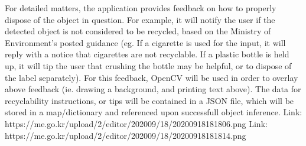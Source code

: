 \documentclass[conference]{IEEEtran}
\begin{document}
For detailed matters, the application provides feedback on how to properly dispose of the object in question. For example, it will notify the user if the detected object is not considered to be recycled, based on the Ministry of Environment's posted guidance (eg. If a cigarette is used for the input, it will reply with a notice that cigarettes are not recyclable. If a plastic bottle is held up, it will tip the user that crushing the bottle may be helpful, or to dispose of the label separately).
\newline
For this feedback, OpenCV will be used in order to overlay above feedback (ie. drawing a background, and printing text above). The data for recyclability instructions, or tips will be contained in a JSON file, which will be stored in a map/dictionary and referenced upon successfull object inference.
\newline
\newline
Link: https://me.go.kr/upload/2/editor/202009/18/20200918181806.png
\newline
Link: https://me.go.kr/upload/2/editor/202009/18/20200918181814.png
\end{document}

